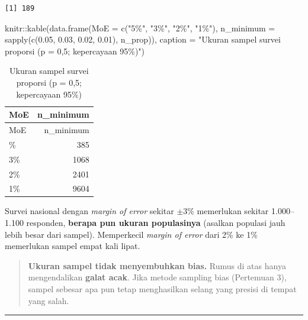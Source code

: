 \documentclass[
  indonesian,
  letterpaper,
]{book}
\newenvironment{Shaded}{\begin{snugshade}}{\end{snugshade}}
\newcommand{\AttributeTok}[1]{\textcolor[rgb]{0.40,0.45,0.13}{#1}}
\newcommand{\FloatTok}[1]{\textcolor[rgb]{0.68,0.00,0.00}{#1}}
\newcommand{\FunctionTok}[1]{\textcolor[rgb]{0.28,0.35,0.67}{#1}}
\newcommand{\NormalTok}[1]{\textcolor[rgb]{0.00,0.23,0.31}{#1}}
\newcommand{\SpecialCharTok}[1]{\textcolor[rgb]{0.37,0.37,0.37}{#1}}
\newcommand{\StringTok}[1]{\textcolor[rgb]{0.13,0.47,0.30}{#1}}
\begin{document}
\begin{verbatim}
[1] 189
\end{verbatim}

\begin{Shaded}
\begin{Highlighting}[]
\NormalTok{knitr}\SpecialCharTok{::}\FunctionTok{kable}\NormalTok{(}\FunctionTok{data.frame}\NormalTok{(}\AttributeTok{MoE =} \FunctionTok{c}\NormalTok{(}\StringTok{"5\%"}\NormalTok{, }\StringTok{"3\%"}\NormalTok{, }\StringTok{"2\%"}\NormalTok{, }\StringTok{"1\%"}\NormalTok{),}
\AttributeTok{n\_minimum =} \FunctionTok{sapply}\NormalTok{(}\FunctionTok{c}\NormalTok{(}\FloatTok{0.05}\NormalTok{, }\FloatTok{0.03}\NormalTok{, }\FloatTok{0.02}\NormalTok{, }\FloatTok{0.01}\NormalTok{), n\_prop)),}
\AttributeTok{caption =} \StringTok{"Ukuran sampel survei proporsi (p = 0,5; kepercayaan 95\%)"}\NormalTok{)}
\end{Highlighting}
\end{Shaded}

\begin{longtable}[]{@{}lr@{}}
\caption{Ukuran sampel survei proporsi (p = 0,5; kepercayaan
95\%)}\tabularnewline
\toprule\noalign{}
MoE & n\_minimum \\
\midrule\noalign{}
\endfirsthead
\toprule\noalign{}
MoE & n\_minimum \\
\midrule\noalign{}
\endhead
\bottomrule\noalign{}
\endlastfoot
5\% & 385 \\
3\% & 1068 \\
2\% & 2401 \\
1\% & 9604 \\
\end{longtable}

Survei nasional dengan \emph{margin of error} sekitar \(\pm 3\%\)
memerlukan sekitar 1.000--1.100 responden, \textbf{berapa pun ukuran
populasinya} (asalkan populasi jauh lebih besar dari sampel).
Memperkecil \emph{margin of error} dari 2\% ke 1\% memerlukan sampel
empat kali lipat.

\begin{quote}
\textbf{Ukuran sampel tidak menyembuhkan bias.} Rumus di atas hanya
mengendalikan \textbf{galat acak}. Jika metode sampling bias (Pertemuan
3), sampel sebesar apa pun tetap menghasilkan selang yang presisi di
tempat yang salah.
\end{quote}

\begin{center}\rule{0.5\linewidth}{0.5pt}\end{center}
\end{document}
